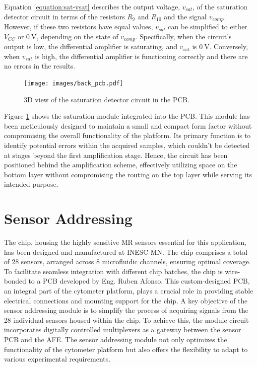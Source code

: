 \noindent
Equation \ref{equation:sat-vsat} describes the output voltage, $v_{sat}$, of the saturation detector circuit in terms of the resistors $R_9$ and $R_{10}$ and the signal $v_{comp}$. However, if these two resistors have equal values, $v_{sat}$ can be simplified to either $V_{CC}$ or $\mathrm{0~V}$, depending on the state of $v_{comp}$. Specifically, when the circuit's output is low, the differential amplifier is saturating, and $v_{sat}$ is $\mathrm{0~V}$. Conversely, when $v_{sat}$ is high, the differential amplifier is functioning correctly and there are no errors in the results.

\begin{figure}[!ht]
    \centering
    \texttt{[image: images/back\_pcb.pdf]}
    \caption{3D view of the saturation detector circuit in the PCB.}
    \label{figure:sat-pcb}
\end{figure}

Figure \ref{figure:sat-pcb} shows the saturation module integrated into the \ac{PCB}. This module has been meticulously designed to maintain a small and compact form factor without compromising the overall functionality of the platform. Its primary function is to identify potential errors within the acquired samples, which couldn't be detected at stages beyond the first amplification stage. Hence, the circuit has been positioned behind the amplification scheme, effectively utilizing space on the bottom layer without compromising the routing on the top layer while serving its intended purpose.


\section{Sensor Addressing}
\label{chapter:fe-addressing}

The chip, housing the highly sensitive \ac{MR} sensors essential for this application, has been designed and manufactured at \ac{INESC-MN}. The chip comprises a total of 28 sensors, arranged across 8 microfluidic channels, ensuring optimal coverage. To facilitate seamless integration with different chip batches, the chip is wire-bonded to a \ac{PCB} developed by Eng. Ruben Afonso. This custom-designed \ac{PCB}, an integral part of the cytometer platform, plays a crucial role in providing stable electrical connections and mounting support for the chip. A key objective of the sensor addressing module is to simplify the process of acquiring signals from the 28 individual sensors housed within the chip. To achieve this, the module circuit incorporates digitally controlled multiplexers as a gateway between the sensor \ac{PCB} and the \ac{AFE}. The sensor addressing module not only optimizes the functionality of the cytometer platform but also offers the flexibility to adapt to various experimental requirements.


